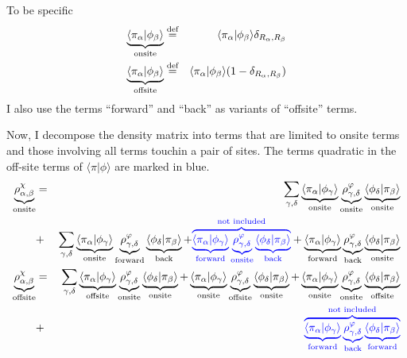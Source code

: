 \documentclass[11pt,a4paper]{report}
\begin{document}
To be specific
\begin{eqnarray}
\underbrace{\langle\pi_\alpha|\phi_\beta\rangle}_{\text{onsite}}
&\stackrel{\text{def}}{=}&
\langle\pi_\alpha|\phi_\beta\rangle\delta_{R_\alpha,R_\beta}
\nonumber\\
\underbrace{\langle\pi_\alpha|\phi_\beta\rangle}_{\text{offsite}}
&\stackrel{\text{def}}{=}&
\langle\pi_\alpha|\phi_\beta\rangle(1-\delta_{R_\alpha,R_\beta})
\end{eqnarray}
I also use the terms ``forward'' and ``back'' as variants of
``offsite'' terms. 



Now, I decompose the density matrix into terms that are limited to
onsite terms and those involving all terms touchin a pair of sites.
The terms quadratic in the off-site terms of
$\langle\pi|\phi\rangle$ are marked in blue. 
\begin{eqnarray}
\underbrace{\rho^{\chi}_{\alpha,\beta}}_{\text{onsite}}
&=& 
\sum_{\gamma,\delta}
\underbrace{\langle\pi_\alpha|\phi_\gamma\rangle}_{\text{onsite}}
\underbrace{\rho^{\varphi}_{\gamma,\delta}}_{\text{onsite}}
\underbrace{\langle\phi_\delta|\pi_\beta\rangle}_{\text{onsite}}
\nonumber\\
&+&
\sum_{\gamma,\delta}
\underbrace{\langle\pi_\alpha|\phi_\gamma\rangle}_{\text{onsite}}
\underbrace{\rho^{\varphi}_{\gamma,\delta}}_{\text{forward}}
\underbrace{\langle\phi_\delta|\pi_\beta\rangle}_{\text{back}}
+
\textcolor{blue}{\overbrace{
\underbrace{\langle\pi_\alpha|\phi_\gamma\rangle}_{\text{forward}}
\underbrace{\rho^{\varphi}_{\gamma,\delta}}_{\text{onsite}}
\underbrace{\langle\phi_\delta|\pi_\beta\rangle}_{\text{back}}
}^{\text{not included}}}
+
\underbrace{\langle\pi_\alpha|\phi_\gamma\rangle}_{\text{forward}}
\underbrace{\rho^{\varphi}_{\gamma,\delta}}_{\text{back}}
\underbrace{\langle\phi_\delta|\pi_\beta\rangle}_{\text{onsite}}
\nonumber\\
%
%
\underbrace{\rho^{\chi}_{\alpha,\beta}}_{\text{offsite}}
&=& 
\sum_{\gamma,\delta}
\underbrace{\langle\pi_\alpha|\phi_\gamma\rangle}_{\text{offsite}}
\underbrace{\rho^{\varphi}_{\gamma,\delta}}_{\text{onsite}}
\underbrace{\langle\phi_\delta|\pi_\beta\rangle}_{\text{onsite}}
+
\underbrace{\langle\pi_\alpha|\phi_\gamma\rangle}_{\text{onsite}}
\underbrace{\rho^{\varphi}_{\gamma,\delta}}_{\text{offsite}}
\underbrace{\langle\phi_\delta|\pi_\beta\rangle}_{\text{onsite}}
+
\underbrace{\langle\pi_\alpha|\phi_\gamma\rangle}_{\text{onsite}}
\underbrace{\rho^{\varphi}_{\gamma,\delta}}_{\text{onsite}}
\underbrace{\langle\phi_\delta|\pi_\beta\rangle}_{\text{offsite}}
\nonumber\\
&+&
\textcolor{blue}{
\overbrace{
\underbrace{\langle\pi_\alpha|\phi_\gamma\rangle}_{\text{forward}}
\underbrace{\rho^{\varphi}_{\gamma,\delta}}_{\text{back}}
\underbrace{\langle\phi_\delta|\pi_\beta\rangle}_{\text{forward}}
}^{\text{not included}}}
\end{eqnarray}
\end{document}
